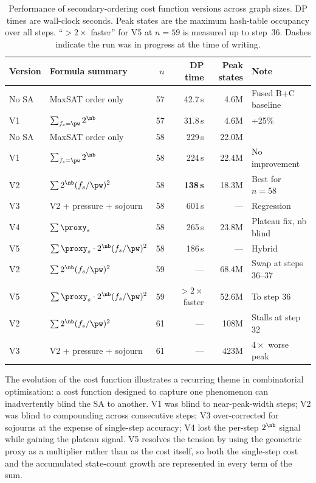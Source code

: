 \begin{table}[H]
\centering
\caption{Performance of secondary-ordering cost function versions across
graph sizes.  DP times are wall-clock seconds.  Peak states are the
maximum hash-table occupancy over all steps.
``$>2\times$ faster'' for V5 at $n=59$ is measured up to step~36.
Dashes indicate the run was in progress at the time of writing.}
\label{tab:costfn}
\setlength{\tabcolsep}{4pt}
\begin{tabular}{llrrrl}
\toprule
Version & Formula summary & $n$ & DP time & Peak states & Note \\
\midrule
No SA & MaxSAT order only
  & 57 & 42.7\,s & 4.6M  & Fused B+C baseline \\
V1 & $\sum_{f_s=\pw} 2^{\nb}$
  & 57 & 31.8\,s & 4.6M  & +25\% \\
\midrule
No SA & MaxSAT order only
  & 58 & 229\,s  & 22.0M & \\
V1 & $\sum_{f_s=\pw} 2^{\nb}$
  & 58 & 224\,s  & 22.4M & No improvement \\
V2 & $\sum 2^{\nb}(f_s/\pw)^2$
  & 58 & \textbf{138\,s}  & 18.3M & Best for $n=58$ \\
V3 & V2 + pressure + sojourn
  & 58 & 601\,s  & ---   & Regression \\
V4 & $\sum \proxy_s$
  & 58 & 265\,s  & 23.8M & Plateau fix, nb blind \\
V5 & $\sum \proxy_s \cdot 2^{\nb}(f_s/\pw)^2$
  & 58 & 186\,s  & ---   & Hybrid \\
\midrule
V2 & $\sum 2^{\nb}(f_s/\pw)^2$
  & 59 & ---     & 68.4M & Swap at steps 36--37 \\
V5 & $\sum \proxy_s \cdot 2^{\nb}(f_s/\pw)^2$
  & 59 & $>2\times$ faster & 52.6M & To step 36 \\
\midrule
V2 & $\sum 2^{\nb}(f_s/\pw)^2$
  & 61 & ---     & 108M  & Stalls at step 32 \\
V3 & V2 + pressure + sojourn
  & 61 & ---     & 423M  & $4\times$ worse peak \\
\bottomrule
\end{tabular}
\end{table}

The evolution of the cost function illustrates a recurring theme in
combinatorial optimisation: a cost function designed to capture one
phenomenon can inadvertently blind the SA to another.
V1 was blind to near-peak-width steps; V2 was blind to compounding
across consecutive steps; V3 over-corrected for sojourns at the expense
of single-step accuracy; V4 lost the per-step $2^{\nb}$ signal while
gaining the plateau signal.
V5 resolves the tension by using the geometric proxy as a multiplier
rather than as the cost itself, so both the single-step cost and the
accumulated state-count growth are represented in every term of the sum.
